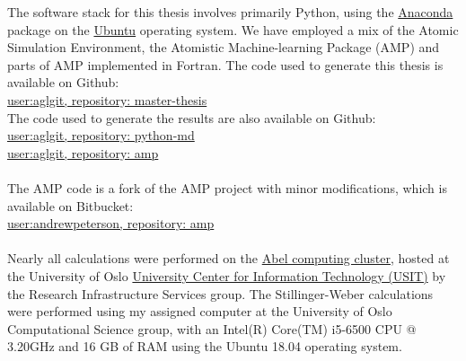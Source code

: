 The software stack for this thesis involves primarily Python,
using the \href{https://www.anaconda.com/}{Anaconda} 
package on the \href{https://ubuntu.com/}{
    Ubuntu} operating system.
We have employed a mix of the Atomic Simulation Environment,
the Atomistic Machine-learning Package (AMP) and parts of AMP implemented
in Fortran.
The code used to generate this thesis is available
on Github: \\
\href{https://github.com/aglgit/master-thesis}{
    user:aglgit, repository: master-thesis} \\
The code used to generate the results are also available
on Github: \\
\href{https://github.com/aglgit/python-md}{
    user:aglgit, repository: python-md} \\
\href{https://github.com/aglgit/amp}{
    user:aglgit, repository: amp} \\
\\
The AMP code is a fork of the AMP project with minor modifications,
which is available on Bitbucket: \\
\href{https://bitbucket.org/andrewpeterson/amp/src/master/}{
    user:andrewpeterson, repository: amp} \\ \\
Nearly all calculations were performed on the 
\href{https://www.uio.no/english/services/it/research/hpc/abel/more/index.html}{Abel computing cluster},
hosted at the University of Oslo
\href{https://www.usit.uio.no/english/}{
University Center for Information Technology (USIT)} by the
Research Infrastructure Services group.
The Stillinger-Weber calculations were performed using my assigned computer
at the University of Oslo Computational Science group, with
an Intel(R) Core(TM) i5-6500 CPU @ 3.20GHz and 16 GB of RAM using
the Ubuntu 18.04 operating system.
